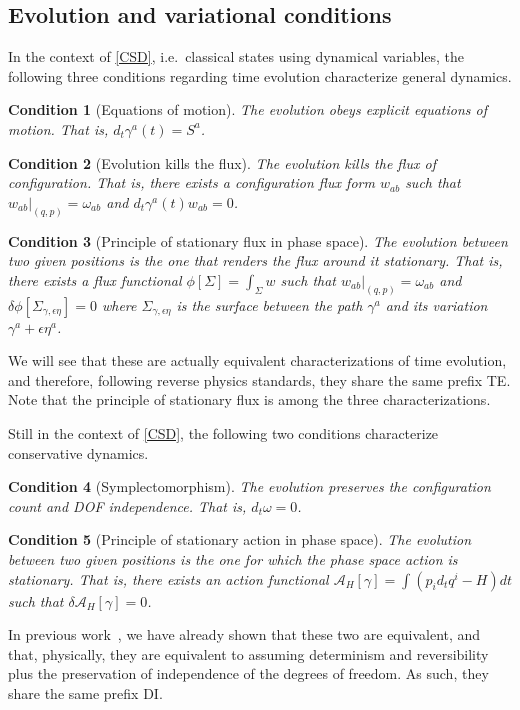 \documentclass[nofootinbib,aps,pre]{revtex4-2}
\newtheorem{condth}{Condition}
\renewcommand*{\thecondth}{\Roman{condth}}
\newenvironment{condition}[2][]{\renewcommand{\thecondth}{#2}\begin{condth}[#1]\label{#2}}{\end{condth}\renewcommand{\thecondth}{\Roman{condth}}}
\begin{document}
\subsection{Evolution and variational conditions}

In the context of \ref{CSD}, i.e.~classical states using dynamical variables, the following three conditions regarding time evolution characterize general dynamics.
\begin{condition}[Equations of motion]{TE-EOM}
	The evolution obeys explicit equations of motion. That is, $d_t \gamma^a(t) = S^a$.
\end{condition}
\begin{condition}[Evolution kills the flux]{TE-FLUX}
	The evolution kills the flux of configuration. That is, there exists a configuration flux form $w_{ab}$ such that $w_{ab}|_{(q,p)}=\omega_{ab}$ and $d_t \gamma^a(t) w_{ab}=0$.
\end{condition}
\begin{condition}[Principle of stationary flux in phase space]{TE-STFL}
	The evolution between two given positions is the one that renders the flux around it stationary. That is, there exists a flux functional $\phi[\Sigma]=\int_{\Sigma} w$ such that $w_{ab}|_{(q,p)}=\omega_{ab}$ and $\delta \phi[\Sigma_{\gamma, \epsilon \eta}]=0$ where $\Sigma_{\gamma, \epsilon \eta}$ is the surface between the path $\gamma^a$ and its variation $\gamma^a + \epsilon \eta^a$.
\end{condition}
We will see that these are actually equivalent characterizations of time evolution, and therefore, following reverse physics standards, they share the same prefix TE. Note that the principle of stationary flux is among the three characterizations.

Still in the context of \ref{CSD}, the following two conditions characterize conservative dynamics.
\begin{condition}[Symplectomorphism]{DI-SYMP}
	The evolution preserves the configuration count and DOF independence. That is, $d_t \omega = 0$.
\end{condition}
\begin{condition}[Principle of stationary action in phase space]{DI-STAC}
	The evolution between two given positions is the one for which the phase space action is stationary. That is, there exists an action functional $\mathcal{A}_H[\gamma] = \int (p_i d_t q^i -H)dt$ such that  $\delta \mathcal{A}_H[\gamma] = 0$.
\end{condition}
In previous work~\cite{geoact}, we have already shown that these two are equivalent, and that, physically, they are equivalent to assuming determinism and reversibility plus the preservation of independence of the degrees of freedom. As such, they share the same prefix DI.
\end{document}
